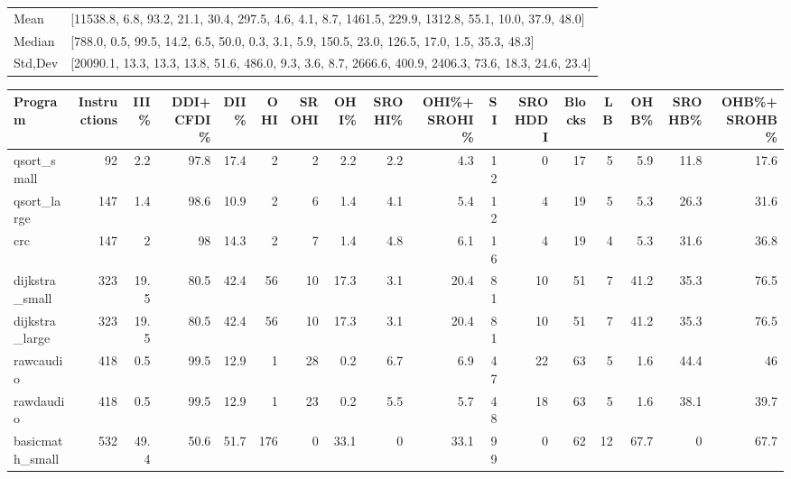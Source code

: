 \begin{tabular}{ll}
\hline
 Mean    & [11538.8, 6.8, 93.2, 21.1, 30.4, 297.5, 4.6, 4.1, 8.7, 1461.5, 229.9, 1312.8, 55.1, 10.0, 37.9, 48.0]  \\
 Median  & [788.0, 0.5, 99.5, 14.2, 6.5, 50.0, 0.3, 3.1, 5.9, 150.5, 23.0, 126.5, 17.0, 1.5, 35.3, 48.3]          \\
 Std,Dev & [20090.1, 13.3, 13.3, 13.8, 51.6, 486.0, 9.3, 3.6, 8.7, 2666.6, 400.9, 2406.3, 73.6, 18.3, 24.6, 23.4] \\
\hline
\end{tabular}
\begin{tabular}{lrrrrrrrrrrrrrrrr}
\hline
 Program         &   Instructions &   III\% &   DDI+CFDI\% &   DII\% &   OHI &   SROHI &   OHI\% &   SROHI\% &   OHI\%+SROHI\% &   SI &   SROHDDI &   Blocks &   LB &   OHB\% &   SROHB\% &   OHB\%+SROHB\% \\
\hline
 qsort\_small     &             92 &    2.2 &        97.8 &   17.4 &     2 &       2 &    2.2 &      2.2 &           4.3 &   12 &         0 &       17 &    5 &    5.9 &     11.8 &          17.6 \\
 qsort\_large     &            147 &    1.4 &        98.6 &   10.9 &     2 &       6 &    1.4 &      4.1 &           5.4 &   12 &         4 &       19 &    5 &    5.3 &     26.3 &          31.6 \\
 crc             &            147 &    2   &        98   &   14.3 &     2 &       7 &    1.4 &      4.8 &           6.1 &   16 &         4 &       19 &    4 &    5.3 &     31.6 &          36.8 \\
 dijkstra\_small  &            323 &   19.5 &        80.5 &   42.4 &    56 &      10 &   17.3 &      3.1 &          20.4 &   81 &        10 &       51 &    7 &   41.2 &     35.3 &          76.5 \\
 dijkstra\_large  &            323 &   19.5 &        80.5 &   42.4 &    56 &      10 &   17.3 &      3.1 &          20.4 &   81 &        10 &       51 &    7 &   41.2 &     35.3 &          76.5 \\
 rawcaudio       &            418 &    0.5 &        99.5 &   12.9 &     1 &      28 &    0.2 &      6.7 &           6.9 &   47 &        22 &       63 &    5 &    1.6 &     44.4 &          46   \\
 rawdaudio       &            418 &    0.5 &        99.5 &   12.9 &     1 &      23 &    0.2 &      5.5 &           5.7 &   48 &        18 &       63 &    5 &    1.6 &     38.1 &          39.7 \\
 basicmath\_small &            532 &   49.4 &        50.6 &   51.7 &   176 &       0 &   33.1 &      0   &          33.1 &   99 &         0 &       62 &   12 &   67.7 &      0   &          67.7 \\

\end{tabular}
